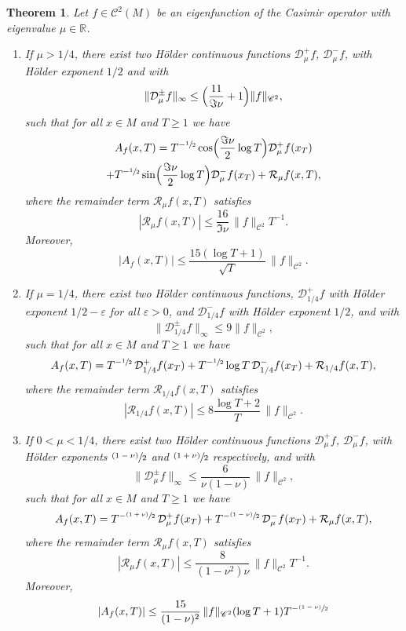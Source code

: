 \documentclass[10pt]{amsart}
\newenvironment{enumeratei}
{\bgroup\def\theenumi{\roman{enumi}}\def\theenumii{\arabic{enumii}}\begin{enumerate}}
{\end{enumerate}\egroup}
\newcommand{\psfrac}[2]{\sfrac{(#1)}{#2}}
\newcommand \R{\mathbb{R}}
\newcommand{\Dp}[1]{\mathcal{D}_\mu^{+} #1}
\newcommand{\Dm}[1]{\mathcal{D}_\mu^{-} #1}
\newcommand{\Dpm}[1]{\mathcal{D}_\mu^{\pm} #1}
\newcommand{\RxT}{\mathcal{R}_\mu f(x,T)}
\newcommand{\aver}[1]{A_{#1}(x,T)}
\newtheorem{theorem}{Theorem}
\theoremstyle{definition}
\begin{document}
\begin{theorem}\label{thm:main1}
Let $f \in \mathscr{C}^2(M)$ be an eigenfunction of the Casimir operator with eigenvalue $\mu \in \R$.
\begin{enumeratei}
\item\label{thm:main1i}
If $\mu > 1/4$, there exist two Hölder continuous functions $\Dp{f}$, $\Dm{f}$, with Hölder exponent $1/2$ and with
\[
\|\Dpm{f} \|_{\infty} \leq \Bigl(\frac{11}{\Im \nu} + 1 \Bigr) \|f\|_{\mathscr{C}^2},
\]
such that for all $x \in M$ and $T \geq 1$ we have
\begin{multline*}
\aver{f} = T^{-\sfrac{1}{2}} \cos\Bigl(\frac{\Im \nu}{2} \log T \Bigr) \Dp{ f(x_T)}\\
+ T^{-\sfrac{1}{2}} \sin\Bigl(\frac{\Im \nu}{2} \log T \Bigr) \Dm{ f(x_T)}+ \RxT,
\end{multline*}
where the remainder term $\RxT$ satisfies
\[
|\RxT|\leq \frac{16}{\Im \nu}\, \|f\|_{\mathscr{C}^2} T^{-1}.
\]
Moreover,
\begin{equation}\label{eq:aux_thm_1_princ}
|\aver{f}|\leq \frac{15(\log T +1)}{\sqrt{T}}\, \|f\|_{\mathscr{C}^2}.
\end{equation}

\item\label{thm:main1ii}
If $\mu = 1/4$, there exist two Hölder continuous functions, $\mathcal{D}^{+}_{1/4}f$ with Hölder exponent $1/2 - \varepsilon$ for all $\varepsilon >0$, and $\mathcal{D}^{-}_{1/4}f$ with Hölder exponent $1/2$, and with
\[
\|\mathcal{D}^{\pm}_{1/4}f \|_{\infty} \leq 9 \|f\|_{\mathscr{C}^2},
\]
such that for all $x \in M$ and $T \geq 1$ we have
\[
\aver{f} = T^{-\sfrac{1}{2}} \, \mathcal{D}^{+}_{1/4} f(x_T) + T^{-\sfrac{1}{2}} \log T \, \mathcal{D}^{-}_{1/4} f(x_T) +\mathcal{R}_{1/4}f(x,T),
\]
where the remainder term $\mathcal{R}_{1/4}f(x,T)$ satisfies
\[
|\mathcal{R}_{1/4}f(x,T)|\leq 8 \frac{\log T +2}{T}\, \|f\|_{\mathscr{C}^2}.
\]

\item\label{thm:main1iii}
If $0< \mu < 1/4$, there exist two Hölder continuous functions $\Dp{f}$, $\Dm{f}$, with Hölder exponents $\psfrac{1-\nu}{2} $ and $\psfrac{1+\nu}{2} $ respectively, and with
\[
\|\Dpm{f} \|_{\infty} \leq \frac{6}{\nu(1-\nu)}\, \|f\|_{\mathscr{C}^2},
\]
such that for all $x \in M$ and $T \geq 1$ we have
\[
\aver{f} = T^{-\psfrac{1+\nu}{2}} \, \Dp{f(x_T) } + T^{-\psfrac{1-\nu}{2}} \, \Dm{ f(x_T)} + \RxT,
\]
where the remainder term $\RxT$ satisfies
\[
|\RxT|\leq \frac{8}{(1-\nu^2) \nu}\, \|f\|_{\mathscr{C}^2} T^{-1}.
\]
Moreover,
\begin{equation}\label{eq:aux_thm_1_comp}
|\aver{f}|\leq \frac{15}{(1-\nu)^2}\, \|f\|_{\mathscr{C}^2} (\log T +1) T^{-\psfrac{1-\nu}{2}}
\end{equation}


\end{enumeratei}
\end{theorem}
\end{document}
